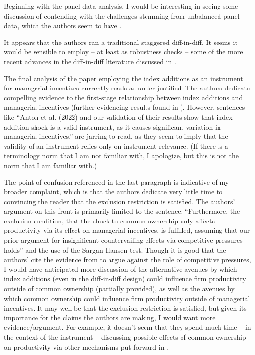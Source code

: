 \documentclass[12pt]{article}
\newif\ifdraft
\begin{document}
Beginning with the panel data analysis, I would be interesting in 
seeing some discussion of contending with the challenges 
stemming from unbalanced panel data, which the authors seem to have 
\ifdraft(baltagi2021) \else\parencite{baltagi2021}\fi.

It appears that the authors ran a traditional 
staggered diff-in-diff. It seems it would be sensible to 
employ -- at least as robustness checks -- 
some of the more recent advances in the diff-in-diff literature
discussed in \ifdraft(baker2022) \else\textcite{baker2022}\fi.




The final analysis of the paper employing the index additions as an instrument
for managerial incentives currently reads as under-justified. The authors 
dedicate compelling evidence to the first-stage relationship between
index additions and managerial incentives (further evidencing 
results found in \ifdraft(anton2023) \else\textcite{anton2023}\fi).
However, sentences like ``Anton et al. (2022) and our validation of their results 
show that index addition shock is a valid instrument, as it causes significant 
variation in managerial incentives.'' are jarring to read, as they seem to imply
that the validity of an instrument relies only on instrument relevance. (If there 
is a terminology norm that I am not familiar with, I apologize, but this is 
not the norm that I am familiar with.) 

The point of confusion referenced in the last paragraph is 
indicative of my broader complaint, which is that the authors dedicate 
very little time to convincing the reader that the 
exclusion restriction is satisfied. The authors' argument
on this front is primarily limited to
the sentence:
``Furthermore, the exclusion condition, that the shock to common 
ownership only affects productivity via its effect on managerial 
incentives, is fulfilled, assuming that our prior argument for 
insignificant countervailing effects via competitive pressures holds''
and the use of the Sargan-Hansen test.
Though it is good that the authors' cite the evidence from 
\ifdraft(afego2017) \else\textcite{afego2017} \fi to 
argue against the role of competitive pressures, I would have anticipated 
more discussion of the alternative avenues by which index additions (even in 
the diff-in-diff design) could 
influence firm productivity outside of common ownership (partially provided), 
as well as 
the avenues by which common ownership could influence firm productivity
outside of managerial incentives. It may well be that the exclusion 
restriction is satisfied, but given its importance for the claims the authors 
are making, I would want more evidence/argument. For example, it doesn't seem that 
they spend much time -- in the context of the instrument -- 
discussing possible effects of common ownership on productivity 
via other mechanisms
put forward in 
\ifdraft(rotemberg1984) \else\textcite{rotemberg1984}\fi.
\end{document}

